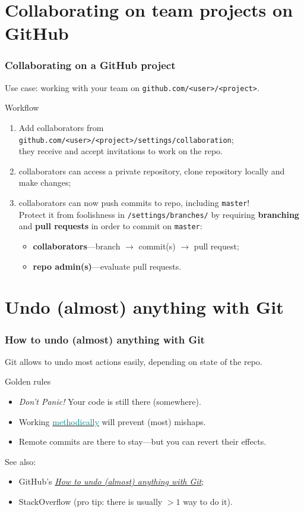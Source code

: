 \documentclass[10pt,svgnames]{beamer}
\begin{document}
\section{Collaborating on team projects on GitHub}
\begin{frame}
\frametitle{Collaborating on a GitHub project}
Use case: working with your team on \lstinline{github.com/<user>/<project>}.

\begin{block}{Workflow}
\begin{enumerate}[<+->]
  \item Add collaborators from \lstinline{github.com/<user>/<project>/settings/collaboration};\\
  they receive and accept invitations to work on the repo.
  \item collaborators can access a private repository, clone repository locally and make changes;
  \item collaborators can now push commits to repo, including \lstinline{master}!\\Protect it from foolishness in \lstinline{/settings/branches/} by requiring \textbf{branching} and \textbf{pull requests} in order to commit on \lstinline{master}:
  \begin{itemize}
    \item \textbf{collaborators}—branch $\rightarrow$ commit(s) $\rightarrow$ pull request;
    \item \textbf{repo admin(s)}—evaluate pull requests.
  \end{itemize}
\end{enumerate}
\end{block}
\end{frame}


\section{Undo (almost) anything with Git}
\begin{frame}
\frametitle{How to undo (almost) anything with Git}

Git allows to undo most actions easily, depending on state of the repo.
\pause
\begin{block}{Golden rules}
\begin{itemize}
  \item \textit{Don't Panic!} Your code is still there (somewhere).
  \item Working \hyperlink{style}{\textcolor{Teal}{methodically}} will prevent (most) mishaps.
  \item Remote commits are there to stay—but you can revert their effects.
\end{itemize} 
\end{block}
\pause
See also:
\begin{itemize}
  \item GitHub's \href{https://github.com/blog/2019-how-to-undo-almost-anything-with-git}{\textit{How to undo (almost) anything with Git}};
  \item StackOverflow (pro tip: there is usually $>1$ way to do it).
\end{itemize}
\end{frame}
\end{document}
